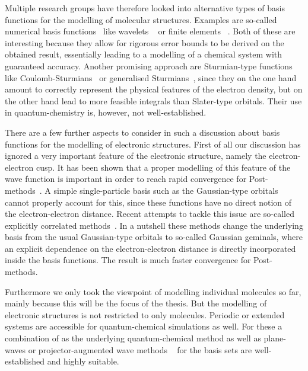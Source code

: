 Multiple research groups have therefore looked
into alternative types of basis functions
for the modelling of molecular structures.
Examples are so-called numerical basis functions~\cite{Frediani2015}
like wavelets%
~\cite{Bischoff2011,Bischoff2012,Bischoff2013,Bischoff2014,Bischoff2014a,Bischoff2017}
or finite elements%
~\cite{Tsuchida1995,Soler2002,Lehtovaara2009,Alizadegan2010,Avery2011PhD,Davydov2015,Boffi2016}.
Both of these are interesting because they allow for rigorous error bounds
to be derived on the obtained result,
essentially leading to a modelling of a chemical system with guaranteed accuracy.
Another promising approach are Sturmian-type functions
like Coulomb-Sturmians~\cite{Shull1959,Rotenberg1962,Rotenberg1970,Gruzdev1990,Hoggan2009,Randazzo2010}
or generalised Sturmians~\cite{Avery2006,Avery2011PhD,Avery2011,Morales2016,Avery2017,Randazzo2015,Granados2016},
since they on the one hand amount to correctly represent
the physical features of the electron density,
but on the other hand lead to more feasible integrals than Slater-type orbitals.
Their use in quantum-chemistry is, however, not well-established.

There are a few further aspects to consider in such a discussion about basis functions
for the modelling of electronic structures.
First of all our discussion has ignored
a very important feature of the electronic structure,
namely the electron-electron cusp.
It has been shown that a proper modelling of this feature of the wave function
is important in order to reach rapid convergence for Post-\HF methods~\cite{Kong2012}.
A simple single-particle basis such as the Gaussian-type
orbitals cannot properly account for this,
since these functions have no direct notion of the electron-electron distance.
Recent attempts to tackle this issue are so-called
explicitly correlated methods~\cite{Kong2012}.
In a nutshell these methods change the underlying
basis from the usual Gaussian-type orbitals to so-called Gaussian geminals,
where an explicit dependence on the electron-electron
distance is directly incorporated inside the basis functions.
The result is much faster convergence for Post-\HF methods.

Furthermore we only took the viewpoint of modelling
individual molecules so far, mainly because this will be the focus of the thesis.
But the modelling of electronic structures is not restricted to only molecules.
Periodic or extended systems are accessible
for quantum-chemical simulations as well.
For these a combination of \DFT as the underlying quantum-chemical method
as well as plane-waves or projector-augmented wave methods%
~\cite{Kresse1996,Kresse1999,Mortensen2005,Enkovaara2010}
for the basis sets are well-established and highly suitable.

